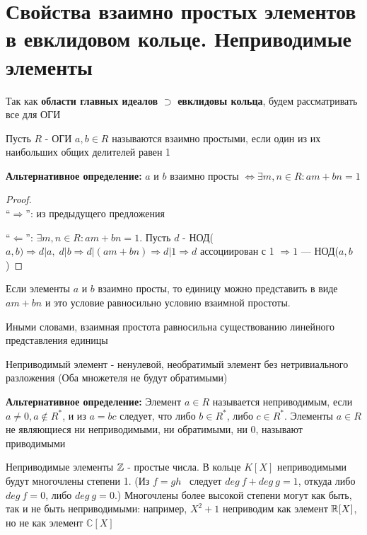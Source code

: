 
\section{Свойства взаимно простых элементов в евклидовом кольце. Неприводимые элементы}
\begin{normalsize}
    Так как \textbf{области главных идеалов} $\supset$ \textbf{евклидовы кольца}, будем рассматривать все для ОГИ \\
    \begin{conj}
        Пусть $R$ - ОГИ 
        $a, b \in R$ называются взаимно простыми, если один из их наибольших общих делителей равен 1
    \end{conj}
    \textbf{Альтернативное определение:} $a$ и $b$ взаимно просты $\Longleftrightarrow \exists m,n \in R: am + bn = 1$ 
    \begin{proof} \quad \\
        ``$\Longrightarrow$'': из предыдущего предложения

        ``$\Longleftarrow$'': $\exists m,n \in R: am + bn = 1$. Пусть $d$ - НОД($a, b) \Longrightarrow d|a, \; d|b \Longrightarrow d|(am + bn) 
        \Longrightarrow d|1 \Longrightarrow d$ ассоциирован с 1 $\Longrightarrow 1$ --- НОД($a, b$) 
    \end{proof}
    Если элементы $a$ и $b$ взаимно просты, то единицу можно представить в виде $am + bn$ и это условие равносильно условию взаимной простоты.

    Иными словами, взаимная простота равносильна существованию линейного представления единицы
    \begin{conj}
        Неприводимый элемент - ненулевой, необратимый элемент без нетривиального разложения (Оба множетеля не будут обратимыми)
    \end{conj}
    \textbf{Альтернативное определение:} Элемент $a \in R$ называется неприводимым, если $a \neq 0, a \notin R^*$, и из 
    $a = bc$ следует, что либо $b \in R^*$, либо $c \in R^*$. Элементы $a \in R$ не являющиеся ни неприводимыми, ни обратимыми, ни 0, называют приводимыми
    
    \qquad Неприводимые элементы $\mathbb{Z}$ - простые числа. В кольце $K[X]$ неприводимыми будут многочлены степени 1. (Из $f = gh$  следует $deg \ f + deg \ g = 1$, откуда либо
    $deg \ f = 0$, либо $deg \ g = 0$.) Многочлены более высокой степени могут как быть, так и не быть неприводимыми: например, $X^2 + 1$ 
    неприводим как элемент $\mathbb{R}[X]$, но не как элемент $\mathbb{C}[X]$


\end{normalsize}
